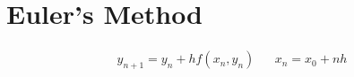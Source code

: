 \section{Euler's Method}
	\begin{align}
		&y_{n+1} = y_{n} + hf(x_{n}, y_{n})&
		&x_{n} = x_{0} + nh&
	\end{align}
